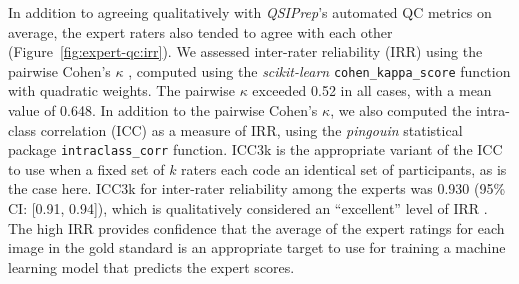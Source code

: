 \documentclass[fleqn,10pt,inline]{wlscirep}
\begin{document}
In addition to agreeing qualitatively with \emph{QSIPrep}'s automated QC metrics
on average, the expert raters also tended to agree with each other (Figure~\ref{fig:expert-qc:irr}). We assessed
inter-rater reliability (IRR) using the pairwise Cohen's $\kappa$
\cite{di-eugenio2004-bb}, computed using the \emph{scikit-learn} \cite{scikit-learn} \texttt{cohen\_kappa\_score}
function with quadratic weights.
The pairwise $\kappa$ exceeded 0.52 in all cases, with a mean value of
0.648. In addition to the pairwise Cohen's $\kappa$, we also computed the
intra-class correlation (ICC) \cite{hallgren2012-ze} as a measure of IRR,
using the \emph{pingouin} statistical package \cite{vallat2018pingouin}
\texttt{intraclass\_corr} function.
ICC3k is the appropriate variant of the ICC to use when a fixed set of $k$ raters each
code an identical set of participants, as is the case here. ICC3k for inter-rater
reliability among the experts was 0.930 (95\% CI: [0.91, 0.94]), which is
qualitatively considered an ``excellent'' level of IRR \cite{Cicchetti1994-fz}.
The high IRR provides confidence that the average of the expert ratings for each
image in the gold standard is an appropriate target to use for training a
machine learning model that predicts the expert scores.
\end{document}
